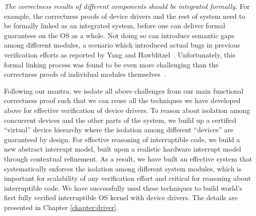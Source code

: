 %
{\em The correctness results of different components should be
integrated formally.} For example, the correctness proofs of device
drivers and the rest of system
need to be formally linked as an integrated system,
before one can deliver formal guarantees on the OS as a whole. Not
doing so can introduce semantic gaps among different modules,
a scenario which introduced actual bugs in previous verification
efforts as reported by Yang and Hawblitzel~\cite{hawblitzel10}. Unfortunately,
this formal linking process was found to be even more challenging than
the correctness proofs of individual modules
themselves~\cite{Alkassar:VSTTE08-225}. 

Following our mantra, we isolate all above challenges from our main
functional correctness proof such that we can reuse all the techniques
we have developed above for effective verification of device drivers.
To reason about isolation among concurrent devices and the other parts
of the system, we build up a certified ``virtual'' device hierarchy where
the isolation among different ``devices'' are guaranteed by design.
For effective reasoning of interruptible code, we build a new abstract
interrupt model, built upon a realistic
hardware interrupt model through contextual refinement.
As a result, we have built an effective system that systematically enforces the
isolation among different system modules, which is important
for scalability of any verification effort and critical for reasoning
about interruptible code. 
We have successfully used these techniques to build world's first fully verified
interruptible OS kernel with device drivers.
The details are presented in Chapter \ref{chapter:driver}.

